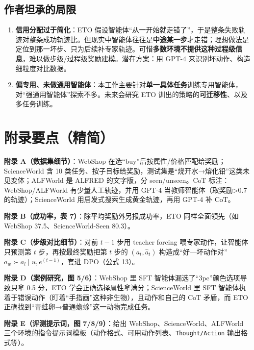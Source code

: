 \documentclass[11pt,UTF8,fontset=fandol]{ctexart}
\begin{document}
\subsection{作者坦承的局限}

\begin{enumerate}[leftmargin=2em,itemsep=3pt]
\item \textbf{信用分配过于简化}：ETO 假设智能体“从一开始就走错了”，于是整条失败轨迹对整条成功轨迹比。但现实中智能体往往是\textbf{中途某一步}才走错；理想做法是定位到那一坏步、只为后续补专家轨迹。可惜\textbf{多数环境不提供这种过程级信息}，难以做步级/过程级奖励建模。潜在方案：用 GPT-4 来识别坏动作、构造细粒度对比数据。
\item \textbf{偏专用、未做通用智能体}：本工作主要针对\textbf{单一具体任务}训练专用智能体，对“强通用智能体”探索不多。未来会研究 ETO 训出的策略的\textbf{可迁移性}、以及多任务训练。
\end{enumerate}

\section*{附录要点（精简）}

\textbf{附录 A（数据集细节）}：WebShop 在选“buy”后按属性/价格匹配给奖励；ScienceWorld 含 10 类任务、按子目标给奖励，测试集是“烧开水→熔化铅”这类未见变体；ALFWorld 是 ALFRED 的文字版，分 seen/unseen。CoT 标注：WebShop/ALFWorld 有少量人工轨迹，并用 GPT-4 当教师智能体（取奖励>0.7 的轨迹）；ScienceWorld 用启发式搜索生成黄金轨迹，再用 GPT-4 补 CoT。

\textbf{附录 B（成功率，表 7）}：除平均奖励外另报成功率，ETO 同样全面领先（如 WebShop 37.5、ScienceWorld-Seen 80.3）。

\textbf{附录 C（步级对比细节）}：对前 $t{-}1$ 步用 teacher forcing 喂专家动作，让智能体只预测第 $t$ 步，再按最终奖励把第 $t$ 步的 $(a_t, \hat{a}_t)$ 构造成“好—坏动作对” $a_w\succ a_l\mid u, e^{(t-1)}$，套进 DPO（公式 13）。

\textbf{附录 D（案例研究，图 5/6）}：WebShop 里 SFT 智能体漏选了“3pc”颜色选项导致只拿 0.5 分，ETO 学会正确选择属性拿满分；ScienceWorld 里 SFT 智能体执着于错误动作（盯着“手指画”这种非生物），且动作和自己的 CoT 矛盾，而 ETO 正确找到“青蛙卵→普通蟾蜍”这一动物完成任务。

\textbf{附录 E（评测提示词，图 7/8/9）}：给出 WebShop、ScienceWorld、ALFWorld 三个环境的指令提示词模板（动作格式、可用动作列表、\texttt{Thought/Action} 输出格式等）。
\end{document}
